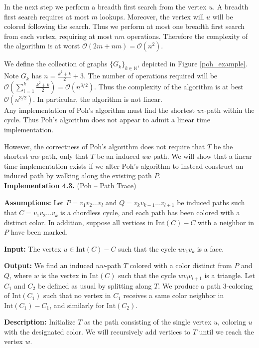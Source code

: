 \documentclass[letterpaper, 12pt]{amsart}
\theoremstyle{definition}
\theoremstyle{definition}
\theoremstyle{thm}
\theoremstyle{definition}
\begin{document}
In the next step we perform a breadth first search from the vertex $u$.
A breadth first search requires at most $m$ lookups. Moreover, the vertex will
$u$ will be colored following the search. Thus we perform at most one breadth
first search from each vertex, requiring at most $nm$ operations.
Therefore the complexity of the algorithm is at worst
$\mathcal{O}(2m + nm)=\mathcal{O}(n^2)$.

We define the collection of graphs $\{G_k\}_{k\in\mathbb{N}}$, depicted in
Figure \ref{poh_example}.
Note $G_k$ has $n=\frac{k^2+k}{2}+3$. The number of operations required will be
$\mathcal{O}\left(\sum_{i=1}^k \frac{k^2+k}{2}\right)=\mathcal{O}(n^{3/2})$.
Thus the complexity of the algorithm is at best $\mathcal{O}(n^{3/2})$. In
particular, the algorithm is not linear.\\

Any implementation of Poh's algorithm must find the shortest $uv$-path
within the cycle.
Thus Poh's algorithm does not appear to admit a linear time implementation.

However, the correctness of Poh's algorithm does not require that $T$
be the shortest $uw$-path, only that $T$ be an induced $uw$-path. We will show that a
linear time implementation exists if we alter Poh's algorithm to instead construct
an induced path by walking along the existing path $P$.\\

\noindent\textbf{Implementation 4.3.} (Poh -- Path Trace)

\noindent\textbf{Assumptions:} Let $P=v_1v_2\ldots v_l$ and
$Q=v_kv_{k-1}\ldots v_{l+1}$ be induced paths such that $C=v_1v_2\ldots v_k$ is
a chordless cycle, and each path has been colored with a distinct color. In
addition, suppose all vertices in $\text{Int}(C)- C$ with a neighbor in $P$
have been marked.

\noindent\textbf{Input:} The vertex $u\in \text{Int}(C)-C$ such that the cycle
$uv_1v_k$ is a face.

\noindent\textbf{Output:} We find an induced $uw$-path $T$ colored with a color distinct
from $P$ and $Q$, where $w$ is the vertex in $\text{Int}(C)$ such that the cycle
$wv_lv_{l+1}$ is a triangle.
Let $C_1$ and $C_2$ be defined as usual by splitting along $T$.
We produce a path $3$-coloring of $\text{Int}(C_1)$ such that
no vertex in $C_1$ receives a same color neighbor in $\text{Int}(C_1)-C_1$,
and similarly for $\text{Int}(C_2)$.

\noindent\textbf{Description:} Initialize $T$ as the path consisting of the
single vertex $u$, coloring $u$ with the designated color. We will recursively
add vertices to $T$ until we reach the vertex $w$.
\end{document}
